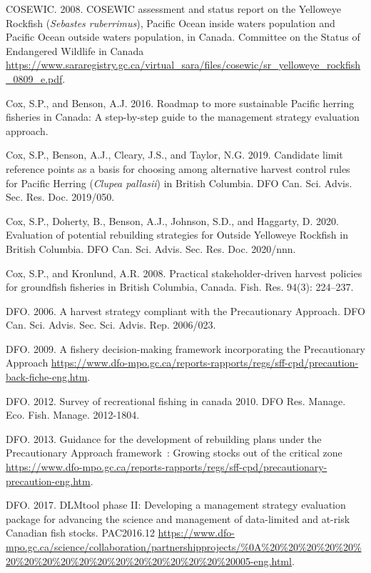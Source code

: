 \documentclass[11pt]{book}
\begin{document}
\leavevmode\hypertarget{ref-cosewic2008}{}%
COSEWIC. 2008. COSEWIC assessment and status report on the Yelloweye Rockfish (\emph{Sebastes ruberrimus}), Pacific Ocean inside waters population and Pacific Ocean outside waters population, in Canada. Committee on the Status of Endangered Wildlife in Canada \url{https://www.sararegistry.gc.ca/virtual_sara/files/cosewic/sr_yelloweye_rockfish_0809_e.pdf}.

\leavevmode\hypertarget{ref-cox2016}{}%
Cox, S.P., and Benson, A.J. 2016. Roadmap to more sustainable Pacific herring fisheries in Canada: A step-by-step guide to the management strategy evaluation approach.

\leavevmode\hypertarget{ref-cox2019}{}%
Cox, S.P., Benson, A.J., Cleary, J.S., and Taylor, N.G. 2019. Candidate limit reference points as a basis for choosing among alternative harvest control rules for Pacific Herring (\emph{Clupea pallasii}) in British Columbia. DFO Can. Sci. Advis. Sec. Res. Doc. 2019/050.

\leavevmode\hypertarget{ref-cox2020}{}%
Cox, S.P., Doherty, B., Benson, A.J., Johnson, S.D., and Haggarty, D. 2020. Evaluation of potential rebuilding strategies for Outside Yelloweye Rockfish in British Columbia. DFO Can. Sci. Advis. Sec. Res. Doc. 2020/nnn.

\leavevmode\hypertarget{ref-cox2008a}{}%
Cox, S.P., and Kronlund, A.R. 2008. Practical stakeholder-driven harvest policies for groundfish fisheries in British Columbia, Canada. Fish. Res. 94(3): 224--237.

\leavevmode\hypertarget{ref-dfo2006}{}%
DFO. 2006. A harvest strategy compliant with the Precautionary Approach. DFO Can. Sci. Advis. Sec. Sci. Advis. Rep. 2006/023.

\leavevmode\hypertarget{ref-dfo2009}{}%
DFO. 2009. A fishery decision-making framework incorporating the Precautionary Approach \url{https://www.dfo-mpo.gc.ca/reports-rapports/regs/sff-cpd/precaution-back-fiche-eng.htm}.

\leavevmode\hypertarget{ref-dfo2012}{}%
DFO. 2012. Survey of recreational fishing in canada 2010. DFO Res. Manage. Eco. Fish. Manage. 2012-1804.

\leavevmode\hypertarget{ref-dfo2013}{}%
DFO. 2013. Guidance for the development of rebuilding plans under the Precautionary Approach framework~: Growing stocks out of the critical zone \url{https://www.dfo-mpo.gc.ca/reports-rapports/regs/sff-cpd/precautionary-precaution-eng.htm}.

\leavevmode\hypertarget{ref-dfo_dlmtool_2017}{}%
DFO. 2017. DLMtool phase II: Developing a management strategy evaluation package for advancing the science and management of data-limited and at-risk Canadian fish stocks. PAC2016.12 \url{https://www.dfo-mpo.gc.ca/science/collaboration/partnershipprojects/\%0A\%20\%20\%20\%20\%20\%20\%20\%20\%20\%20\%20\%20\%20\%20\%20\%20\%20\%20005-eng.html}.
\end{document}
